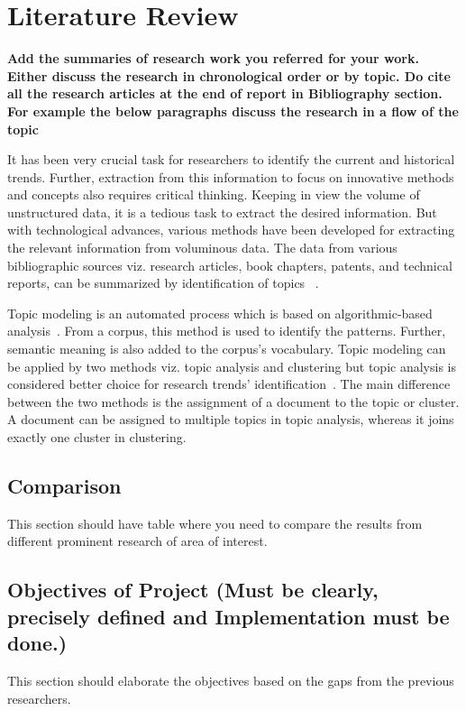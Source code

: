 \chapter{Literature Review}


\textbf{Add the summaries of research work you referred for your work. Either discuss the research in chronological order or by topic. Do cite all the research articles at the end of report in Bibliography section. For example the below paragraphs discuss the research in a flow of the topic} 


It has been very crucial task for researchers to identify the current and historical trends. Further, extraction from this information to focus on innovative methods and concepts also requires critical thinking. Keeping in view the volume of unstructured data, it is a tedious task to extract the desired information. But with technological advances, various methods have been developed for extracting the relevant information from voluminous data. The data from various bibliographic sources  viz. research articles, book chapters, patents, and technical reports, can be summarized by identification of topics ~\cite{Mei2005,Hurtado2016}.

Topic modeling is an automated process which is based on algorithmic-based analysis~\cite{Canini2009,Saini2013}. From a corpus, this method is used to identify the patterns. Further, semantic meaning is also added to the corpus's vocabulary. Topic modeling can be applied by two methods viz. topic analysis and clustering but topic analysis is considered better choice for research trends' identification~\cite{Evangelopoulos2012}. The main difference between the two methods is the assignment of a document to the topic or cluster. A document can be assigned to multiple topics in topic analysis, whereas it joins exactly one cluster in clustering. 


\section{Comparison}
This section should have table where you need to compare the results from different prominent research of area of interest. 
\section{Objectives of Project (Must be clearly, precisely defined and Implementation must be done.)}
This section should elaborate the objectives based on the gaps from the previous researchers.
